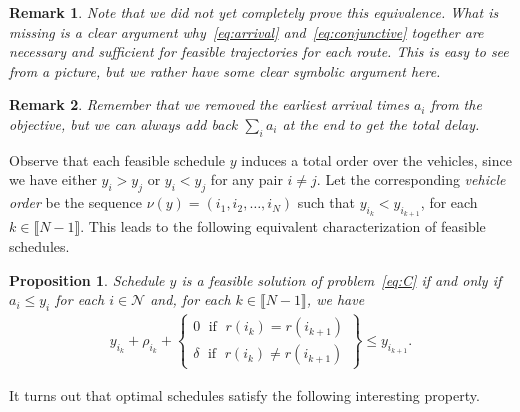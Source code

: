 \documentclass{article}
\theoremstyle{definition}
\theoremstyle{plain}
\newtheorem{proposition}{Proposition}
\newtheorem*{remark}{Remark}
\begin{document}
\begin{remark}
  Note that we did not yet completely prove this equivalence. What is missing is
  a clear argument why~\eqref{eq:arrival} and~\eqref{eq:conjunctive} together are necessary and sufficient for
  feasible trajectories for each route. This is easy to see from a picture, but
  we rather have some clear symbolic argument here.
\end{remark}
\begin{remark}
  Remember that we removed the earliest arrival times $a_i$ from the objective,
  but we can always add back $\sum_i a_i$ at the end to get the total delay.
\end{remark}

Observe that each feasible schedule $y$ induces a total order over the vehicles,
since we have either $y_i > y_j$ or $y_i < y_j$ for any pair $i \neq j$.
%
Let the corresponding \emph{vehicle order} be the sequence
$\nu(y) = (i_1, i_2, \dots, i_N)$ such that $y_{i_k} < y_{i_{k+1}}$, for each
$k \in \llbracket N-1 \rrbracket$.
%
This leads to the following equivalent characterization of feasible schedules.

\begin{proposition}\label{thm:feasible-schedule}
  Schedule $y$ is a feasible solution of problem~\eqref{eq:C} if and only if
  $a_i \leq y_i$ for each $i \in \mathcal{N}$ and, for each
  $k \in \llbracket N - 1 \rrbracket$, we have
  \begin{align}
    y_{i_k} + \rho_{i_k} +
    \left\{
    \begin{array}{l}
    0 \; \text{ if } \; r(i_k) = r(i_{k+1}) \\
    \delta \; \text{ if } \; r(i_k) \neq r(i_{k+1})
    \end{array}
    \right\} \leq y_{i_{k+1}} .
  \end{align}
\end{proposition}

It turns out that optimal schedules satisfy the following interesting property.
\end{document}

